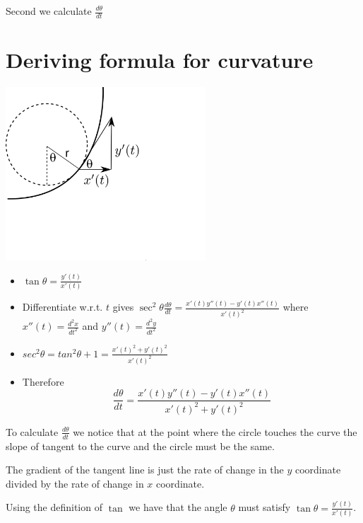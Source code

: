 \documentclass[12pt]{article} %
\theoremstyle{definition}
\theoremstyle{theorem}
\begin{document}
Second we calculate $\frac{d\theta}{dt}$

\section{Deriving formula for curvature}
\begin{tcolorbox}
	\begin{minipage}{\linewidth}
		\centering
		\includegraphics[width=75mm, scale=0.65]{curvature_illustration_2.png}
	\end{minipage}
	\begin{itemize}
		\item $\tan \theta = \frac{y'(t)}{x'(t)}$ 
		\item Differentiate w.r.t. $t$ gives $\sec ^2 \theta \frac{d\theta}{dt} = \frac{x'(t) y''(t) - y'(t) x''(t)}{x'(t)^2}$
		where $x''(t)=\frac{d^2 x}{dt^2}$ and $y''(t)=\frac{d^2 y}{dt^2}$
		\item $sec^2\theta = tan^2\theta +1 = \frac{{x'(t)^2+y'(t)^2}}{x'(t)^2}$ 
		\item Therefore
		\begin{equation} \label{eq:2}
			\frac{d\theta}{dt}=\frac{x'(t) y''(t) - y'(t) x''(t)}{x'(t)^2+y'(t)^2}
		\end{equation}
	\end{itemize}
\end{tcolorbox}

To calculate $\frac{d\theta}{dt}$ we notice that at the point where the circle touches the curve the slope of tangent to the curve and the circle must be the same.

The gradient of the tangent line is just the rate of change in the $y$ coordinate divided by the rate of change in $x$ coordinate.

Using the definition of $\tan$ we have that the angle $\theta$ must satisfy  $\tan \theta = \frac{y'(t)}{x'(t)}$.
\end{document}
